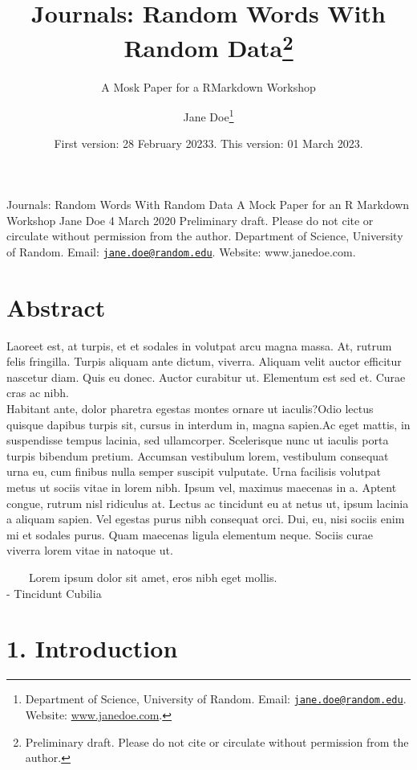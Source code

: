 \documentclass[
  12,
]{article}
\title{Journals: Random Words With Random Data\footnote{Preliminary
  draft. Please do not cite or circulate without permission from the
  author.}}
\subtitle{A Mosk Paper for a RMarkdown Workshop}
\author{Jane Doe\footnote{Department of Science, University of Random.
  Email:
  \href{mailto:jane.doe@random.edu}{\nolinkurl{jane.doe@random.edu}}.
  Website: \href{https://www.janedoe.com}{www.janedoe.com}.}}
\date{First version: 28 February 20233. This version: 01 March 2023.}
\begin{document}
\maketitle

Journals: Random Words With Random Data A Mock Paper for an R Markdown
Workshop Jane Doe 4 March 2020 Preliminary draft. Please do not cite or
circulate without permission from the author. Department of Science,
University of Random. Email:
\href{mailto:jane.doe@random.edu}{\nolinkurl{jane.doe@random.edu}}.
Website: www.janedoe.com.

\hypertarget{abstract}{%
\section{Abstract}\label{abstract}}

Laoreet est, at turpis, et et sodales in volutpat arcu magna massa. At,
rutrum felis fringilla. Turpis aliquam ante dictum, viverra. Aliquam
velit auctor efficitur nascetur diam. Quis eu donec. Auctor curabitur
ut. Elementum est sed et. Curae cras ac nibh.\\
Habitant ante, dolor pharetra egestas montes ornare ut iaculis?Odio
lectus quisque dapibus turpis sit, cursus in interdum in, magna
sapien.Ac eget mattis, in suspendisse tempus lacinia, sed ullamcorper.
Scelerisque nunc ut iaculis porta turpis bibendum pretium. Accumsan
vestibulum lorem, vestibulum consequat urna eu, cum finibus nulla semper
suscipit vulputate. Urna facilisis volutpat metus ut sociis vitae in
lorem nibh. Ipsum vel, maximus maecenas in a. Aptent congue, rutrum nisl
ridiculus at. Lectus ac tincidunt eu at netus ut, ipsum lacinia a
aliquam sapien. Vel egestas purus nibh consequat orci. Dui, eu, nisi
sociis enim mi et sodales purus. Quam maecenas ligula elementum neque.
Sociis curae viverra lorem vitae in natoque ut.

~~~~Lorem ipsum dolor sit amet, eros nibh eget mollis.\\
\hspace*{0.333em}\hspace*{0.333em}\hspace*{0.333em}\hspace*{0.333em}-
Tincidunt Cubilia

\hypertarget{introduction}{%
\section{1. Introduction}\label{introduction}}
\end{document}
